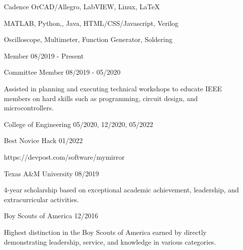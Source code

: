 \documentclass[11pt]{article}
\begin{document}

      {Cadence OrCAD/Allegro, LabVIEW, Linux, \LaTeX}

      {MATLAB, Python,\CPP, Java, HTML/CSS/Javascript, Verilog}

      {Oscilloscope, Multimeter, Function Generator, Soldering}



\begin{description}
\squish
{}
           {Member}
           {08/2019 - Present}

           {Committee Member}
           {08/2019 - 05/2020}

Assisted in planning and executing technical workshops to educate IEEE members on hard skills
such as programming, circuit design, and microcontrollers.

\end{description}


\begin{description}
\squish
{}
           {College of Engineering}
           {05/2020, 12/2020, 05/2022}

           {Best Novice Hack}
           {01/2022}

https://devpost.com/software/mymirror

           {Texas A\&M University}
           {08/2019}

4-year scholarship based on exceptional academic achievement, leadership, and extracurricular activities.

           {Boy Scouts of America}
           {12/2016}

Highest distinction in the Boy Scouts of America earned by directly demonstrating
leadership, service, and knowledge in various categories.

\end{description}
\end{document}
